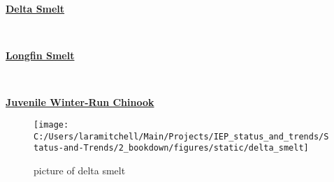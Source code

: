 \documentclass[
]{book}
\begin{document}
\begin{panel-grid}

\begin{columns-nocenter}

\begin{column800}

\textbf{\href{http://calfish.ucdavis.edu/species/?uid=47\&ds=698}{Delta Smelt}}

\end{column800}

\begin{column40}

~

\end{column40}

\begin{column800}

\textbf{\href{http://calfish.ucdavis.edu/species/?uid=87\&ds=698}{Longfin Smelt}}

\end{column800}

\begin{column40}

~

\end{column40}

\begin{column800}

\textbf{\href{http://calfish.ucdavis.edu/species/?uid=30\&ds=698}{Juvenile Winter-Run Chinook}}

\end{column800}

\end{columns-nocenter}

\begin{columns-nocenter}

\begin{column800}

\begin{figure}

{\centering \texttt{[image: C:/Users/laramitchell/Main/Projects/IEP\_status\_and\_trends/Status-and-Trends/2\_bookdown/figures/static/delta\_smelt]} 

}

\caption{picture of delta smelt}\label{fig:unnamed-chunk-179}
\end{figure}

\end{column800}

\begin{column40}


\end{column40}
\end{columns-nocenter}
\end{panel-grid}
\end{document}
